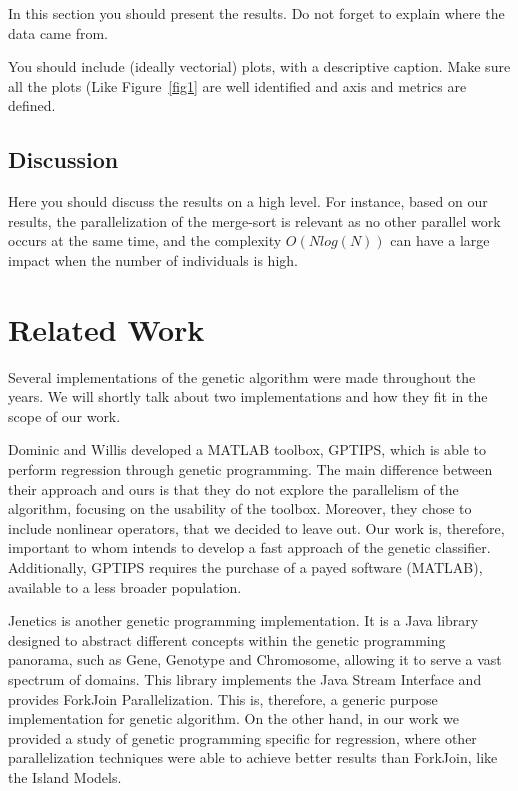 \documentclass[runningheads]{llncs}
\begin{document}
In this section you should present the results. Do not forget to explain where the data came from. 

You should include (ideally vectorial) plots, with a descriptive caption. Make sure all the plots (Like Figure~\ref{fig1} are well identified and axis and metrics are defined.

\subsection{Discussion}

Here you should discuss the results on a high level. For instance, based on our results, the parallelization of the merge-sort is relevant as no other parallel work occurs at the same time, and the complexity $O(N log(N))$ can have a large impact when the number of individuals is high.

\section{Related Work}

Several implementations of the genetic algorithm were made throughout the years. We will shortly talk about two implementations and how they fit in the scope of our work.

Dominic and Willis  \cite{GPTIPS} developed a MATLAB toolbox, GPTIPS, which is able to perform regression through genetic programming. The main difference between their approach and  ours is that they do not explore the parallelism of the algorithm, focusing on the usability of the toolbox. Moreover, they chose to include nonlinear operators, that we decided to leave out. Our work is, therefore, important to whom intends to develop a fast approach of the genetic classifier. Additionally, GPTIPS requires the purchase of a payed software (MATLAB), available to a less broader population.

Jenetics \cite{jenetics} is another genetic programming implementation. It is a Java library designed to abstract different concepts within the genetic programming panorama, such as Gene, Genotype and Chromosome, allowing it to serve a vast spectrum of domains. This library implements the Java Stream Interface and provides ForkJoin Parallelization. This is, therefore, a generic purpose implementation for genetic algorithm. On the other hand, in our work we provided a study of genetic programming specific for regression, where other parallelization techniques were able to achieve better results than ForkJoin, like the Island Models.
\end{document}
